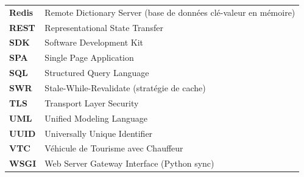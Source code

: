 \begin{longtable}{p{2.5cm} p{12cm}}
\textbf{Redis} & Remote Dictionary Server (base de données clé-valeur en mémoire) \\
\textbf{REST} & Representational State Transfer \\
\textbf{SDK} & Software Development Kit \\
\textbf{SPA} & Single Page Application \\
\textbf{SQL} & Structured Query Language \\
\textbf{SWR} & Stale-While-Revalidate (stratégie de cache) \\
\textbf{TLS} & Transport Layer Security \\
\textbf{UML} & Unified Modeling Language \\
\textbf{UUID} & Universally Unique Identifier \\
\textbf{VTC} & Véhicule de Tourisme avec Chauffeur \\
\textbf{WSGI} & Web Server Gateway Interface (Python sync) \\
\end{longtable}
